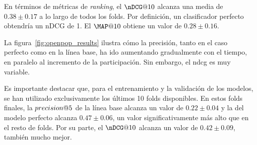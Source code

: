 En términos de métricas de \textit{ranking}, el $\nDCG@10$ alcanza una media de $0.38\pm0.17$ a lo largo de todos los folds. Por definición, un clasificador perfecto obtendría un nDCG de 1. El $\MAP@10$ obtiene un valor de $0.28\pm0.16$.


La figura~\ref{fig:openpop_results} ilustra cómo la precisión, tanto en el caso perfecto como en la línea base, ha ido aumentando gradualmente con el tiempo, en paralelo al incremento de la participación. Sin embargo, el \gls{ndcg} es muy variable.

Es importante destacar que, para el entrenamiento y la validación de los modelos, se han utilizado exclusivamente los últimos 10 folds disponibles. En estos folds finales, la $precision@5$ de la línea base alcanza un valor de $0.22\pm0.04$ y la del modelo perfecto alcanza $0.47\pm0.06$, un valor significativamente más alto que en el resto de folds. Por su parte, el $\nDCG@10$ alcanza un valor de $0.42\pm0.09$, también mucho mejor.



